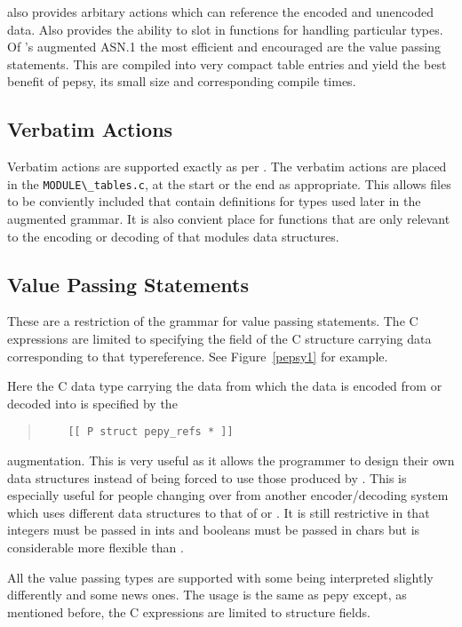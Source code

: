  also provides arbitary actions which can reference the encoded and
unencoded data.
Also provides the ability to slot in functions for handling particular types.
Of 's augmented ASN.1 the most efficient and encouraged are
the value passing statements.
This are compiled into very compact table entries and yield the
best benefit of pepsy, its small size and corresponding compile times.

\subsection{Verbatim Actions}

Verbatim actions are supported exactly as per .
The verbatim actions are placed in the \verb"MODULE\_tables.c", at the
start or the end as appropriate.
This allows files to be conviently included that contain definitions
for types used later in the augmented grammar.
It is also convient place for functions that are only relevant to the
encoding or decoding of that modules data structures.

\subsection{Value Passing Statements}

These are a restriction of the  grammar for value passing
statements.
The C expressions are limited to specifying the field of the C structure
carrying data corresponding to that typereference.
See Figure~\ref{pepsy1} for example.

Here the C data type carrying the data from which the data is encoded from
or decoded into is specified by the
\begin{quote}\begin{verbatim}
    [[ P struct pepy_refs * ]]
\end{verbatim}\end{quote}
augmentation.
This is very useful as it allows the programmer to design their
own data structures instead of being forced to use those
produced by .
This is especially useful for people changing over from another
encoder/decoding system which uses different data structures to that of
 or .
It is still restrictive in that integers must be passed in ints and booleans
must be passed in chars but is considerable more flexible than .

All the value passing types are supported with some being interpreted
slightly differently and some news ones.
The usage is the same as pepy except, as mentioned before, the C expressions
are limited to structure fields.


